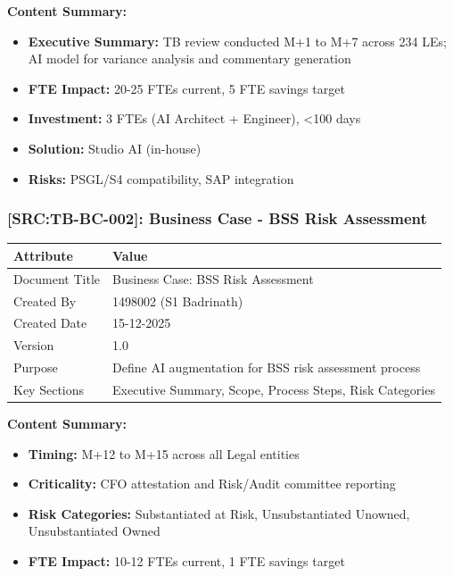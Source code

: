 \documentclass[11pt,a4paper]{article}
\newcommand{\srcref}[1]{\textcolor{sourcegreen}{\textbf{[SRC:#1]}}}
\begin{document}
\textbf{Content Summary:}
\begin{itemize}[noitemsep]
    \item \textbf{Executive Summary:} TB review conducted M+1 to M+7 across 234 LEs; AI model for variance analysis and commentary generation
    \item \textbf{FTE Impact:} 20-25 FTEs current, 5 FTE savings target
    \item \textbf{Investment:} 3 FTEs (AI Architect + Engineer), <100 days
    \item \textbf{Solution:} Studio AI (in-house)
    \item \textbf{Risks:} PSGL/S4 compatibility, SAP integration
\end{itemize}

\subsubsection{\srcref{TB-BC-002}: Business Case - BSS Risk Assessment}

\begin{table}[h]
\centering
\begin{tabular}{@{}L{4cm}L{10cm}@{}}
\toprule
\textbf{Attribute} & \textbf{Value} \\
\midrule
Document Title & Business Case: BSS Risk Assessment \\
Created By & 1498002 (S1 Badrinath) \\
Created Date & 15-12-2025 \\
Version & 1.0 \\
Purpose & Define AI augmentation for BSS risk assessment process \\
Key Sections & Executive Summary, Scope, Process Steps, Risk Categories \\
\bottomrule
\end{tabular}
\end{table}

\textbf{Content Summary:}
\begin{itemize}[noitemsep]
    \item \textbf{Timing:} M+12 to M+15 across all Legal entities
    \item \textbf{Criticality:} CFO attestation and Risk/Audit committee reporting
    \item \textbf{Risk Categories:} Substantiated at Risk, Unsubstantiated Unowned, Unsubstantiated Owned
    \item \textbf{FTE Impact:} 10-12 FTEs current, 1 FTE savings target
\end{itemize}
\end{document}
